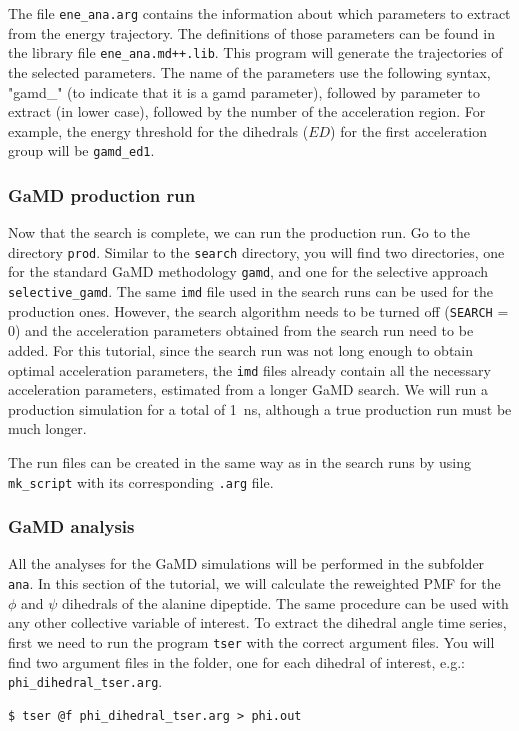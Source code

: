 The file \texttt{ene\_ana.arg} contains the information about which parameters to extract from the energy trajectory. The definitions of those parameters can be found in the library file \texttt{ene\_ana.md++.lib}. This program will generate the trajectories of the selected parameters. The name of the parameters use the following syntax, "gamd\_" (to indicate that it is a gamd parameter), followed by parameter to extract (in lower case), followed by the number of the acceleration region. For example, the energy threshold for the dihedrals ($ED$) for the first acceleration group will be \texttt{gamd\_ed1}.

\subsubsection{GaMD production run}
Now that the search is complete, we can run the production run.
Go to the directory \texttt{prod}. Similar to the \texttt{search} directory, you will find two directories, one for the standard GaMD methodology \texttt{gamd}, and one for the selective approach \texttt{selective\_gamd}. 
The same \texttt{imd} file used in the search runs can be used for the production ones. However, the search algorithm needs to be turned off (\texttt{SEARCH} = 0) and the acceleration parameters obtained from the search run need to be added. 
For this tutorial, since the search run was not long enough to obtain optimal acceleration parameters, the \texttt{imd} files already contain all the necessary acceleration parameters, estimated from a longer GaMD search. We will run a production simulation for a total of 1~ns, although a true production run must be much longer.

The run files can be created in the same way as in the search runs by using \texttt{mk\_script} with its corresponding \texttt{.arg} file.

\subsubsection{GaMD analysis}

All the analyses for the GaMD simulations will be performed in the subfolder \texttt{ana}. 
In this section of the tutorial, we will calculate the reweighted PMF for the $\phi$ and $\psi$ dihedrals of the alanine dipeptide. The same procedure can be used with any other collective variable of interest.
To extract the dihedral angle time series, first we need to run the program \texttt{tser} with the correct argument files. You will find two argument files in the folder, one for each dihedral of interest, e.g.: \texttt{phi\_dihedral\_tser.arg}.
 \begin{lstlisting}
$ tser @f phi_dihedral_tser.arg > phi.out
\end{lstlisting}


